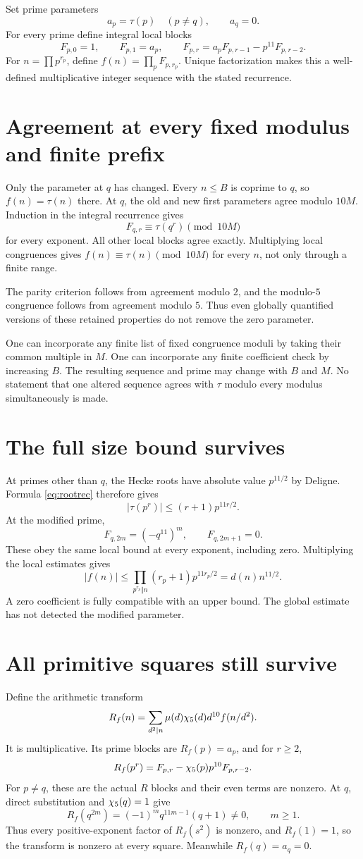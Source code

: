 Set prime parameters
\[
a_p=\tau(p)\quad(p\ne q),\qquad a_q=0.
\]
For every prime define integral local blocks
\[
F_{p,0}=1,\qquad F_{p,1}=a_p,\qquad
F_{p,r}=a_pF_{p,r-1}-p^{11}F_{p,r-2}.
\]
For $n=\prod p^{r_p}$, define $f(n)=\prod_pF_{p,r_p}$. Unique factorization makes this a well-defined multiplicative integer sequence with the stated recurrence.

\section{Agreement at every fixed modulus and finite prefix}
Only the parameter at $q$ has changed. Every $n\le B$ is coprime to $q$, so $f(n)=\tau(n)$ there. At $q$, the old and new first parameters agree modulo $10M$. Induction in the integral recurrence gives
\[
F_{q,r}\equiv\tau(q^r)\pmod{10M}
\]
for every exponent. All other local blocks agree exactly. Multiplying local congruences gives $f(n)\equiv\tau(n)\pmod{10M}$ for every $n$, not only through a finite range.

The parity criterion follows from agreement modulo $2$, and the modulo-$5$ congruence follows from agreement modulo $5$. Thus even globally quantified versions of these retained properties do not remove the zero parameter.

One can incorporate any finite list of fixed congruence moduli by taking their common multiple in $M$. One can incorporate any finite coefficient check by increasing $B$. The resulting sequence and prime may change with $B$ and $M$. No statement that one altered sequence agrees with $\tau$ modulo every modulus simultaneously is made.

\section{The full size bound survives}
At primes other than $q$, the Hecke roots have absolute value $p^{11/2}$ by Deligne. Formula \eqref{eq:rootrec} therefore gives
\[
|\tau(p^r)|\le(r+1)p^{11r/2}.
\]
At the modified prime,
\[
F_{q,2m}=(-q^{11})^m,\qquad F_{q,2m+1}=0.
\]
These obey the same local bound at every exponent, including zero. Multiplying the local estimates gives
\[
|f(n)|\le\prod_{p^{r_p}\Vert n}(r_p+1)p^{11r_p/2}
=d(n)n^{11/2}.
\]
A zero coefficient is fully compatible with an upper bound. The global estimate has not detected the modified parameter.

\section{All primitive squares still survive}
Define the arithmetic transform
\[
R_f(n)=\sum_{d^2\mid n}\mu(d)\chi_5(d)d^{10}f(n/d^2).
\]
It is multiplicative. Its prime blocks are $R_f(p)=a_p$, and for $r\ge2$,
\[
R_f(p^r)=F_{p,r}-\chi_5(p)p^{10}F_{p,r-2}.
\]
For $p\ne q$, these are the actual $R$ blocks and their even terms are nonzero. At $q$, direct substitution and $\chi_5(q)=1$ give
\[
R_f(q^{2m})=(-1)^mq^{11m-1}(q+1)\ne0,\qquad m\ge1.
\]
Thus every positive-exponent factor of $R_f(s^2)$ is nonzero, and $R_f(1)=1$, so the transform is nonzero at every square. Meanwhile $R_f(q)=a_q=0$.

